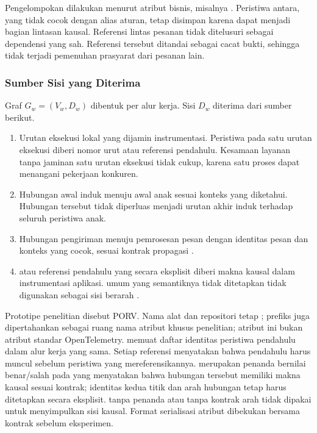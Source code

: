 Pengelompokan dilakukan menurut atribut bisnis, misalnya . Peristiwa antara, yang tidak cocok dengan alias aturan, tetap disimpan karena dapat menjadi bagian lintasan kausal. Referensi lintas pesanan tidak ditelusuri sebagai dependensi yang sah. Referensi tersebut ditandai sebagai cacat bukti, sehingga tidak terjadi pemenuhan prasyarat dari pesanan lain.

\subsubsection{Sumber Sisi yang Diterima}
Graf $G_w=(V_w,D_w)$ dibentuk per alur kerja. Sisi $D_w$ diterima dari sumber berikut.
\begin{enumerate}
  \item Urutan eksekusi lokal yang dijamin instrumentasi. Peristiwa pada satu urutan eksekusi diberi nomor urut atau referensi pendahulu. Kesamaan layanan tanpa jaminan satu urutan eksekusi tidak cukup, karena satu proses dapat menangani pekerjaan konkuren.
  \item Hubungan awal  induk menuju awal  anak sesuai konteks yang diketahui. Hubungan tersebut tidak diperluas menjadi urutan akhir induk terhadap seluruh peristiwa anak.
  \item Hubungan pengiriman menuju pemrosesan pesan dengan identitas pesan dan konteks yang cocok, sesuai kontrak propagasi \citep{otelmessaging}.
  \item {} atau referensi pendahulu yang secara eksplisit diberi makna kausal dalam instrumentasi aplikasi.  umum yang semantiknya tidak ditetapkan tidak digunakan sebagai sisi berarah \citep{otelapi}.
\end{enumerate}

Prototipe penelitian disebut PORV. Nama alat dan repositori tetap ; prefiks  juga dipertahankan sebagai ruang nama atribut khusus penelitian; atribut ini bukan atribut standar OpenTelemetry.  memuat daftar identitas peristiwa pendahulu dalam alur kerja yang sama. Setiap referensi menyatakan bahwa pendahulu harus muncul sebelum peristiwa yang mereferensikannya.  merupakan penanda bernilai benar/salah pada  yang menyatakan bahwa hubungan tersebut memiliki makna kausal sesuai kontrak; identitas kedua titik dan arah hubungan tetap harus ditetapkan secara eksplisit.  tanpa penanda atau tanpa kontrak arah tidak dipakai untuk menyimpulkan sisi kausal. Format serialisasi atribut dibekukan bersama kontrak sebelum eksperimen.

